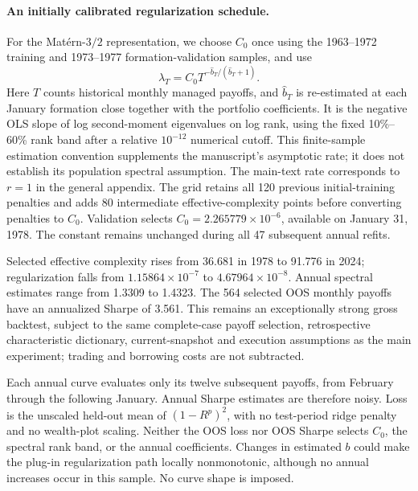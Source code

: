 \paragraph{An initially calibrated regularization schedule.}
For the Mat\'ern-$3/2$ representation, we choose $C_0$ once using the
1963--1972 training and 1973--1977 formation-validation samples, and use
\[
\lambda_T=C_0 T^{-\widehat b_T/(\widehat b_T+1)}.
\]
Here $T$ counts historical monthly managed payoffs, and $\widehat b_T$ is
re-estimated at each January formation close together with the portfolio
coefficients. It is the negative OLS slope of log second-moment eigenvalues
on log rank, using the fixed 10\%--60\% rank band after a relative $10^{-12}$
numerical cutoff. This finite-sample estimation convention supplements the
manuscript's asymptotic rate; it does not establish its population spectral
assumption. The main-text rate corresponds to $r=1$ in the general appendix.
The grid retains all 120 previous initial-training penalties and adds 80
intermediate effective-complexity points before converting penalties to $C_0$.
Validation selects $C_0=2.265779\times10^{-6}$, available on January 31, 1978.
The constant remains unchanged during all 47 subsequent annual refits.

Selected effective complexity rises from 36.681 in 1978 to 91.776 in 2024;
regularization falls from $1.15864\times10^{-7}$ to $4.67964\times10^{-8}$.
Annual spectral estimates range from 1.3309 to 1.4323. The 564 selected
OOS monthly payoffs have an annualized Sharpe of 3.561. This remains an
exceptionally strong gross backtest, subject to the same complete-case payoff
selection, retrospective characteristic dictionary, current-snapshot and
execution assumptions as the main experiment; trading and borrowing costs
are not subtracted.

Each annual curve evaluates only its twelve subsequent payoffs, from February
through the following January. Annual Sharpe estimates are therefore noisy.
Loss is the unscaled held-out mean of $(1-R^p)^2$, with no test-period ridge
penalty and no wealth-plot scaling. Neither the OOS loss nor OOS Sharpe selects
$C_0$, the spectral rank band, or the annual coefficients. Changes in estimated
$b$ could make the plug-in regularization path locally nonmonotonic, although
no annual increases occur in this sample. No curve shape is imposed.

